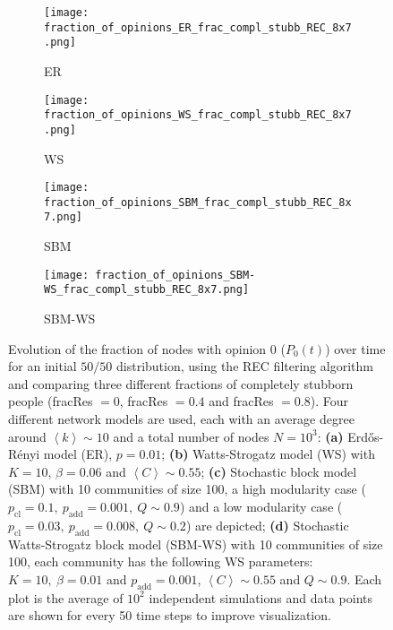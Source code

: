 \documentclass[11 pt , letterpaper , twoside , openright]{book}
\begin{document}
\begin{figure}[H]
  \begin{subfigure}[b]{0.49\textwidth}
  	\texttt{[image: fraction\_of\_opinions\_ER\_frac\_compl\_stubb\_REC\_8x7.png]}
    \caption{ER}
  \end{subfigure}
  \begin{subfigure}[b]{0.49\textwidth}
  	\texttt{[image: fraction\_of\_opinions\_WS\_frac\_compl\_stubb\_REC\_8x7.png]}
    \caption{WS}
  \end{subfigure}
  \begin{subfigure}[b]{0.49\textwidth}
    \texttt{[image: fraction\_of\_opinions\_SBM\_frac\_compl\_stubb\_REC\_8x7.png]}
    \caption{SBM}
  \end{subfigure}
  \begin{subfigure}[b]{0.49\textwidth}
    \texttt{[image: fraction\_of\_opinions\_SBM-WS\_frac\_compl\_stubb\_REC\_8x7.png]}
    \caption{SBM-WS}
  \end{subfigure}
  \captionsetup{format=plain}
  \caption[Evolution of the fraction of nodes with opinion 0 ($P_0(t)$) over time for an initial $50/50$ opinion distribution, using the REC filtering algorithm and comparing three different fractions of completely stubborn people (fracRes $= 0$, fracRes $= 0.4$ and fracRes $= 0.8$).]{Evolution of the fraction of nodes with opinion 0 ($P_0(t)$) over time for an initial $50/50$ distribution, using the REC filtering algorithm and comparing three different fractions of completely stubborn people (fracRes $= 0$, fracRes $= 0.4$ and fracRes $= 0.8$). Four different network models are used, each with an average degree around $\left<k\right> \sim 10$ and a total number of nodes $N = 10^3$: \textbf{(a)} Erd\H{o}s-R\'{e}nyi model (ER), $p=0.01$; \textbf{(b)} Watts-Strogatz model (WS) with $K = 10$, $\beta = 0.06$ and $\left<C\right> \sim 0.55$; \textbf{(c)} Stochastic block model (SBM) with 10 communities of size 100, a high modularity case ($p_{\text{cl}} = 0.1,\ p_{\text{add}} = 0.001,\ Q \sim 0.9$) and a low modularity case ($p_{\text{cl}} = 0.03,\ p_{\text{add}} = 0.008,\ Q \sim 0.2$) are depicted; \textbf{(d)} Stochastic Watts-Strogatz block model (SBM-WS) with 10 communities of size 100, each community has the following WS parameters: $K = 10,\ \beta = 0.01$ and $p_{\text{add}} = 0.001$, $\left<C\right> \sim 0.55$ and $Q \sim 0.9$. Each plot is the average of $10^2$ independent simulations and data points are shown for every 50 time steps to improve visualization.}%
\label{ev_op_50_50_stubb_REC}
\end{figure}
\end{document}
